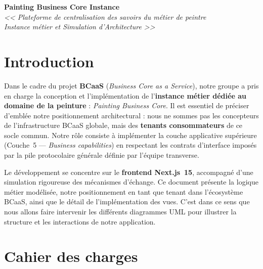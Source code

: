 \documentclass[12pt,a4paper]{report}
\begin{document}
\begin{center}
    {\LARGE\textbf{Painting Business Core Instance}}\\[0.3cm]
    {\Large\textit{<< Plateforme de centralisation des savoirs du métier de peintre\\ Instance métier et Simulation d'Architecture  >>}}\\[1cm]
\end{center}

\tableofcontents
\newpage

\section{Introduction}

Dans le cadre du projet \textbf{BCaaS} (\textit{Business Core as a Service}), notre groupe a pris en charge la conception et l'implémentation de l'\textbf{instance métier dédiée au domaine de la peinture} : \textit{Painting Business Core}. Il est essentiel de préciser d'emblée notre positionnement architectural : nous ne sommes pas les concepteurs de l'infrastructure BCaaS globale, mais des \textbf{tenants consommateurs} de ce socle commun. Notre rôle consiste à implémenter la couche applicative supérieure (Couche~5 --- \textit{Business capabilities}) en respectant les contrats d'interface imposés par la pile protocolaire générale définie par l'équipe transverse.

Le développement se concentre sur le \textbf{frontend Next.js~15}, accompagné d'une simulation rigoureuse des mécanismes d'échange. Ce document présente la logique métier modélisée, notre positionnement en tant que tenant dans l'écosystème BCaaS, ainsi que le détail de l'implémentation des vues. C'est dans ce sens que nous allons faire intervenir les différents diagrammes UML pour illustrer la structure et les interactions de notre application.

\newpage
\section{Cahier des charges}
\end{document}
